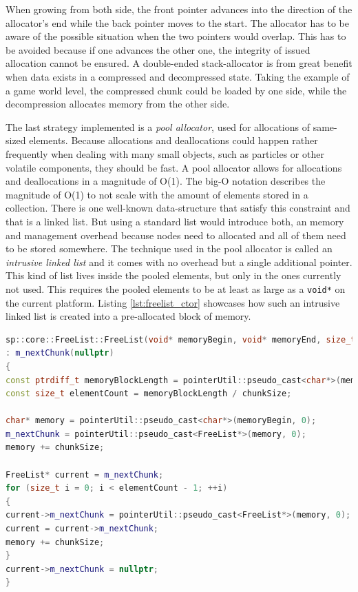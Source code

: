 When growing from both side, the front pointer advances into the direction of the allocator's end while the back pointer moves to the start. The allocator has to be aware of the possible situation when the two pointers would overlap. This has to be avoided because if one advances the other one, the integrity of issued allocation cannot be ensured. A double-ended stack-allocator is from great benefit when data exists in a compressed and decompressed state. Taking the example of a game world level, the compressed chunk could be loaded by one side, while the decompression allocates memory from the other side.

The last strategy implemented is a \textit{pool allocator}, used for allocations of same-sized elements. Because allocations and deallocations could happen rather frequently when dealing with many small objects, such as particles or other volatile components, they should be fast. A pool allocator allows for allocations and deallocations in a magnitude of O(1). The big-O notation describes the magnitude of O(1) to not scale with the amount of elements stored in a collection. There is one well-known data-structure that satisfy this constraint and that is a linked list. But using a standard list would introduce both, an memory and management overhead because nodes need to allocated and all of them need to be stored somewhere. The technique used in the pool allocator is called an \textit{intrusive linked list} and it comes with no overhead but a single additional pointer. This kind of list lives inside the pooled elements, but only in the ones currently not used. This requires the pooled elements to be at least as large as a \texttt{void*} on the current platform. Listing \ref{lst:freelist_ctor} showcases how such an intrusive linked list is created into a pre-allocated block of memory.\\

\begin{lstlisting}[caption={Constructor of the FreeList class in the C++ project. It showcases how the list is created in a pre-allocated memory region.}, label={lst:freelist_ctor}, language={C++}]
sp::core::FreeList::FreeList(void* memoryBegin, void* memoryEnd, size_t chunkSize)
: m_nextChunk(nullptr)
{
const ptrdiff_t memoryBlockLength = pointerUtil::pseudo_cast<char*>(memoryEnd, 0) - pointerUtil::pseudo_cast<char*>(memoryBegin, 0);
const size_t elementCount = memoryBlockLength / chunkSize;

char* memory = pointerUtil::pseudo_cast<char*>(memoryBegin, 0);
m_nextChunk = pointerUtil::pseudo_cast<FreeList*>(memory, 0);
memory += chunkSize;

FreeList* current = m_nextChunk;
for (size_t i = 0; i < elementCount - 1; ++i)
{
current->m_nextChunk = pointerUtil::pseudo_cast<FreeList*>(memory, 0);
current = current->m_nextChunk;
memory += chunkSize;
}
current->m_nextChunk = nullptr;
}
\end{lstlisting}

